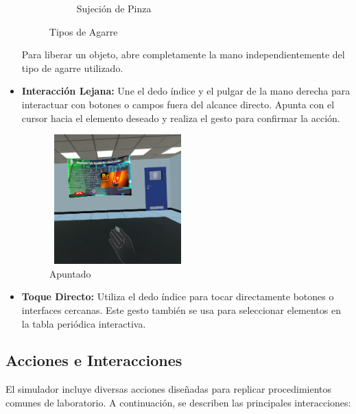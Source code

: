 \begin{itemize}
\begin{figure}[thbp]
\begin{subfigure}[b]{0.4\linewidth}
            \caption{Sujeción de Pinza}
            \label{fig:Sujeción_Pinza}
        \end{subfigure}
        \caption{Tipos de Agarre}
    \end{figure}
    Para liberar un objeto, abre completamente la mano independientemente del tipo de agarre utilizado.

    \item \textbf{Interacción Lejana:}  
    Une el dedo índice y el pulgar de la mano derecha para interactuar con botones o campos fuera del alcance directo. Apunta con el cursor hacia el elemento deseado y realiza el gesto para confirmar la acción.
    \begin{figure}[thbp]
        \centering
        \includegraphics[width=0.5\textwidth, height = 5cm]{img/Interacciones/Apuntado_Manos.png}
        \caption{Apuntado}
        \label{fig:Apuntado}
    \end{figure}
    \item \textbf{Toque Directo:}  
    Utiliza el dedo índice para tocar directamente botones o interfaces cercanas. Este gesto también se usa para seleccionar elementos en la tabla periódica interactiva.
\end{itemize}
\newpage
\subsection{Acciones e Interacciones}

El simulador incluye diversas acciones diseñadas para replicar procedimientos comunes de laboratorio. A continuación, se describen las principales interacciones:

